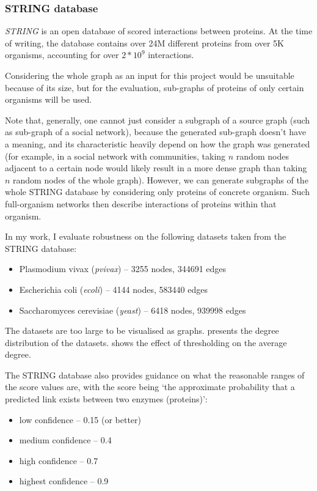 \subsubsection{STRING database}\label{sec:string_database}

\textit{STRING}\cite{Szklarczyk2019} is an open database of scored interactions between proteins.
At the time of writing, the database contains over 24M different proteins from over 5K organisms, accounting for over $2 * 10^9$ interactions.

Considering the whole graph as an input for this project would be unsuitable because of its size, but for the evaluation, sub-graphs of proteins of only certain organisms will be used.

Note that, generally, one cannot just consider a subgraph of a source graph (such as sub-graph of a social network), because the generated sub-graph doesn't have a meaning, and its characteristic heavily depend on how the graph was generated (for example, in a social network with communities, taking $n$ random nodes adjacent to a certain node would likely result in a more dense graph than taking $n$ random nodes of the whole graph).
However, we can generate subgraphs of the whole STRING database by considering only proteins of concrete organism.
Such full-organism networks then describe interactions of proteins within that organism.

In my work, I evaluate robustness on the following datasets taken from the STRING database:
\begin{itemize}
    \item Plasmodium vivax (\textsl{pvivax}) -- 3255 nodes, 344691 edges
    \item Escherichia coli (\textsl{ecoli}) -- 4144 nodes, 583440 edges
    \item Saccharomyces cerevisiae (\textsl{yeast}) -- 6418 nodes, 939998 edges
\end{itemize}

The datasets are too large to be visualised as graphs.
 presents the degree distribution of the datasets.
 shows the effect of thresholding on the average degree.

The STRING database also provides guidance on what the reasonable ranges of the score values are, with the score being `the approximate probability that a predicted link exists between two enzymes (proteins)':
\begin{itemize}
    \item low confidence -- 0.15 (or better)
    \item medium confidence -- 0.4
    \item high confidence -- 0.7
    \item highest confidence -- 0.9
\end{itemize}

